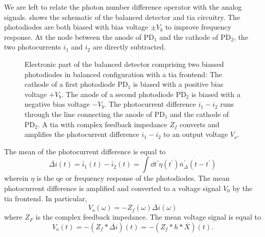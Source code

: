We are left to relate the photon number difference operator with the analog signals.
 shows the schematic of the balanced detector and \gls{tia} circuitry.
The photodiodes are both biased with bias voltage $\pm V_b$ to improve frequency response.
At the node between the anode of $\text{PD}_1$ and the cathode of $\text{PD}_2$, the two photocurrents $i_1$ and $i_2$ are directly subtracted.
\begin{figure}[htb]
    \centering
    
    \caption{Electronic part of the balanced detector comprising two biassed photodiodes in balanced configuration with a \gls{tia} frontend: The cathode of a first photodiode $\text{PD}_1$ is biased with a positive bias voltage $+V_b$. The anode of a second photodiode $\text{PD}_2$ is biased with a negative bias voltage $-V_b$. The photocurrent difference $i_1-i_2$ runs through the line connecting the anode of $\text{PD}_1$ and the cathode of $\text{PD}_2$. A \gls{tia} with complex feedback impedance $Z_f$ converts and amplifies the photocurrent difference $i_1-i_2$ to an output voltage $V_o$.}\label{fig:balanced_detector_electronics}
\end{figure}
The mean of the photocurrent difference is equal to
\begin{equation}
	\overline{\Delta i}(t)
	=
	\overline{i}_1(t)
	-
	\overline{i}_2(t)
	=
	\int\dd{t^\prime}
	\eta(t^\prime)
	\overline{n}_\Delta^\prime(t-t^\prime)
\end{equation}
wherein $\eta$ is the \gls{qe} or frequency response of the photodiodes.
The mean photocurrent difference is amplified and converted to a voltage signal $V_0$ by the \gls{tia} frontend.
In particular,
\begin{equation}
	V_o(\omega)
	=
	-
	Z_f(\omega)
	\overline{\Delta i}(\omega)
\end{equation}
where $Z_F$ is the complex feedback impedance.
The mean voltage signal is equal to
\begin{equation}
	V_o(t)
	=
	-
	\left(Z_f*\overline{\Delta i}\right)(t)
	=
	-
	\left(Z_f*h*\overline{X}\right)(t)
	.
\end{equation}

